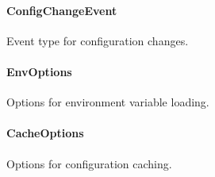 \hypertarget{configchangeevent-1}{%
\paragraph{ConfigChangeEvent}\label{configchangeevent-1}}

Event type for configuration changes.

\begin{Shaded}
\begin{Highlighting}[]
\OperatorTok{\textless{}}\OperatorTok{\textgreater{}} \OperatorTok{=}\NormalTok{ \{}
\OperatorTok{:}\OperatorTok{;}
\OperatorTok{:}\OperatorTok{;}
\OperatorTok{:} \OperatorTok{;}
\OperatorTok{:} \OperatorTok{;}
\NormalTok{\}}\OperatorTok{;}
\end{Highlighting}
\end{Shaded}

\hypertarget{envoptions-1}{%
\paragraph{EnvOptions}\label{envoptions-1}}

Options for environment variable loading.

\begin{Shaded}
\begin{Highlighting}[]
 \OperatorTok{;}
 \OperatorTok{;}
 \NormalTok{[]}\OperatorTok{;}
 \OperatorTok{;}
 \OperatorTok{;}
 \OperatorTok{;}
\NormalTok{\}}
\end{Highlighting}
\end{Shaded}

\hypertarget{cacheoptions-1}{%
\paragraph{CacheOptions}\label{cacheoptions-1}}

Options for configuration caching.

